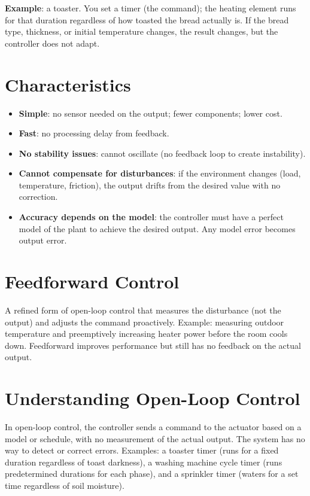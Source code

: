 \documentclass[11pt,letterpaper,twoside,openany]{book}
\begin{document}
\textbf{Example}: a toaster. You set a timer (the command); the heating element runs for that duration regardless of how toasted the bread actually is. If the bread type, thickness, or initial temperature changes, the result changes, but the controller does not adapt.

\section{Characteristics}
\begin{itemize}[leftmargin=1.5em]
\item \textbf{Simple}: no sensor needed on the output; fewer components; lower cost.
\item \textbf{Fast}: no processing delay from feedback.
\item \textbf{No stability issues}: cannot oscillate (no feedback loop to create instability).
\item \textbf{Cannot compensate for disturbances}: if the environment changes (load, temperature, friction), the output drifts from the desired value with no correction.
\item \textbf{Accuracy depends on the model}: the controller must have a perfect model of the plant to achieve the desired output. Any model error becomes output error.
\end{itemize}

\section{Feedforward Control}
A refined form of open-loop control that measures the disturbance (not the output) and adjusts the command proactively. Example: measuring outdoor temperature and preemptively increasing heater power before the room cools down. Feedforward improves performance but still has no feedback on the actual output.



\section{Understanding Open-Loop Control}
In open-loop control, the controller sends a command to the actuator based on a model or schedule, with no measurement of the actual output. The system has no way to detect or correct errors. Examples: a toaster timer (runs for a fixed duration regardless of toast darkness), a washing machine cycle timer (runs predetermined durations for each phase), and a sprinkler timer (waters for a set time regardless of soil moisture).
\end{document}
